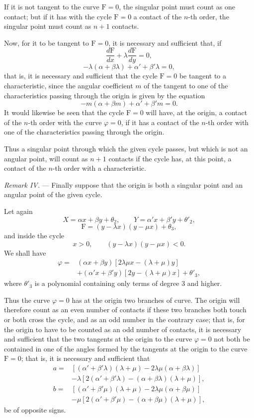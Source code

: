 \documentclass[11pt]{article}
\begin{document}
If it is not tangent to the curve $\mathrm F=0$, the singular point must count as one contact; but if it has with the cycle $\mathrm F=0$ a contact of the $n$-th order, the singular point must count as $n+1$ contacts.

Now, for it to be tangent to $\mathrm F=0$, it is necessary and sufficient that, if
\[
\frac{d\mathrm F}{dx}+\lambda\frac{d\mathrm F}{dy}=0,
\]
\[
-\lambda(\alpha+\beta\lambda)+\alpha'+\beta'\lambda=0,
\]
that is, it is necessary and sufficient that the cycle $\mathrm F=0$ be tangent to a characteristic, since the angular coefficient $m$ of the tangent to one of the characteristics passing through the origin is given by the equation
\[
-m(\alpha+\beta m)+\alpha'+\beta'm=0.
\]
It would likewise be seen that the cycle $\mathrm F=0$ will have, at the origin, a contact of the $n$-th order with the curve $\varphi=0$, if it has a contact of the $n$-th order with one of the characteristics passing through the origin.

Thus a singular point through which the given cycle passes, but which is not an angular point, will count as $n+1$ contacts if the cycle has, at this point, a contact of the $n$-th order with a characteristic.

\emph{Remark IV.} --- Finally suppose that the origin is both a singular point and an angular point of the given cycle.

Let again
\[
X=\alpha x+\beta y+\theta_2,
\qquad
Y=\alpha'x+\beta'y+\theta'_2,
\]
\[
\mathrm F=(y-\lambda x)(y-\mu x)+\theta_3,
\]
and inside the cycle
\[
x>0,
\qquad
(y-\lambda x)(y-\mu x)<0.
\]
We shall have
\[
\begin{aligned}
\varphi={}&(\alpha x+\beta y)[2\lambda\mu x-(\lambda+\mu)y]\\
&+(\alpha'x+\beta'y)[2y-(\lambda+\mu)x]+\theta'_3,
\end{aligned}
\]
where $\theta'_3$ is a polynomial containing only terms of degree $3$ and higher.

Thus the curve $\varphi=0$ has at the origin two branches of curve. The origin will therefore count as an even number of contacts if these two branches both touch or both cross the cycle, and as an odd number in the contrary case; that is, for the origin to have to be counted as an odd number of contacts, it is necessary and sufficient that the two tangents at the origin to the curve $\varphi=0$ not both be contained in one of the angles formed by the tangents at the origin to the curve $\mathrm F=0$; that is, it is necessary and sufficient that
\[
\begin{aligned}
a={}&[(\alpha'+\beta'\lambda)(\lambda+\mu)-2\lambda\mu(\alpha+\beta\lambda)]\\
&-\lambda[2(\alpha'+\beta'\lambda)-(\alpha+\beta\lambda)(\lambda+\mu)],\\
b={}&[(\alpha'+\beta'\mu)(\lambda+\mu)-2\lambda\mu(\alpha+\beta\mu)]\\
&-\mu[2(\alpha'+\beta'\mu)-(\alpha+\beta\mu)(\lambda+\mu)],
\end{aligned}
\]
be of opposite signs.
\end{document}
